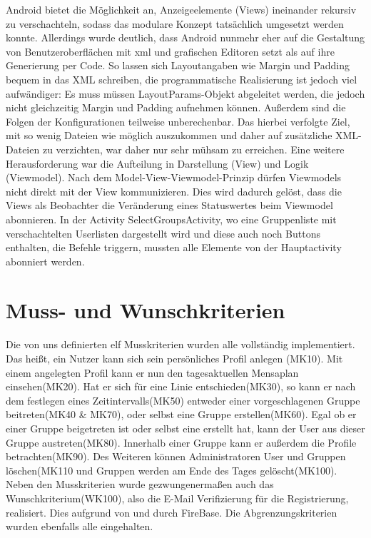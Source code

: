 \documentclass[a4paper]{scrreprt}
\begin{document}
Android bietet die Möglichkeit an, Anzeigeelemente (Views) ineinander rekursiv zu verschachteln, sodass das modulare Konzept tatsächlich umgesetzt werden konnte. Allerdings wurde deutlich, dass Android nunmehr eher auf die Gestaltung von Benutzeroberflächen mit xml und grafischen Editoren setzt als auf ihre Generierung per Code. So lassen sich Layoutangaben wie Margin und Padding bequem in das XML schreiben, die programmatische Realisierung ist jedoch viel aufwändiger: Es muss müssen LayoutParams-Objekt abgeleitet werden, die jedoch nicht gleichzeitig Margin und Padding aufnehmen können. Außerdem sind die Folgen der Konfigurationen teilweise unberechenbar. Das hierbei verfolgte Ziel, mit so wenig Dateien wie möglich auszukommen und daher auf zusätzliche XML-Dateien zu verzichten, war daher nur sehr mühsam zu erreichen. 
Eine weitere Herausforderung war die Aufteilung in Darstellung (View) und Logik (Viewmodel). Nach dem Model-View-Viewmodel-Prinzip dürfen Viewmodels nicht direkt mit der View kommunizieren. Dies wird dadurch gelöst, dass die Views als Beobachter die Veränderung eines Statuswertes beim Viewmodel abonnieren. In der Activity SelectGroupsActivity, wo eine Gruppenliste mit verschachtelten Userlisten dargestellt wird und diese auch noch Buttons enthalten, die Befehle triggern, mussten alle Elemente von der Hauptactivity abonniert werden.

\chapter{Muss- und Wunschkriterien}
Die von uns definierten elf Musskriterien wurden alle vollständig implementiert. Das heißt, ein Nutzer kann sich sein persönliches Profil anlegen (\Gls{MK10}). Mit einem angelegten Profil kann er nun den tagesaktuellen Mensaplan einsehen(\Gls{MK20}). Hat er sich für eine Linie entschieden(\Gls{MK30}), so kann er nach dem festlegen eines Zeitintervalls(\Gls{MK50}) entweder einer vorgeschlagenen Gruppe beitreten(\Gls{MK40} \& \Gls{MK70}), oder selbst eine Gruppe erstellen(\Gls{MK60}). Egal ob er einer Gruppe beigetreten ist oder selbst eine erstellt hat, kann der User aus dieser Gruppe austreten(\Gls{MK80}). Innerhalb einer Gruppe kann er außerdem die Profile betrachten(\Gls{MK90}). Des Weiteren können Administratoren User und Gruppen löschen(\Gls{MK110} und Gruppen werden am Ende des Tages gelöscht(\Gls{MK100}).
Neben den Musskriterien wurde gezwungenermaßen auch das Wunschkriterium(\Gls{WK100}), also die E-Mail Verifizierung für die Registrierung, realisiert. Dies aufgrund von und durch FireBase. Die Abgrenzungskriterien wurden ebenfalls alle eingehalten.
\end{document}
